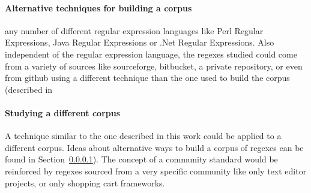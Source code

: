\paragraph{Alternative techniques for building a corpus}
\label{sec:alternateCorpus}
any number of different regular expression languages like Perl Regular Expressions, Java Regular Expressions or .Net Regular Expressions.  Also independent of the regular expression language, the regexes studied could come from a variety of sources like sourceforge, bitbucket, a private repository, or even from github using a different technique than the one used to build the corpus (described in

\paragraph{Studying a different corpus}
A technique similar to the one described in this work could be applied to a different corpus.  Ideas about alternative ways to build a corpus of regexes can be found in Section~\ref{sec:alternateCorpus}).  The concept of a community standard would be reinforced by regexes sourced from a very specific community like only text editor projects, or only shopping cart frameworks.

